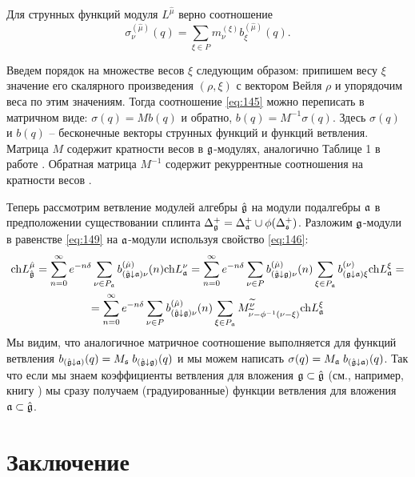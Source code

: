Для струнных функций модуля
$L^{\hat{\mu}}$ верно соотношение
\begin{equation}
  \label{eq:145}
   \sigma^{(\hat{\mu})}_{\nu}(q) = \sum_{\xi\in P} m^{(\xi)}_{\nu} b^{(\hat{\mu})}_{\xi}(q).
\end{equation}

Введем порядок на множестве весов $\xi$ следующим образом:
припишем весу  $\xi$ значение его скалярного произведения $(\rho,\xi)$ с вектором Вейля $\rho$ и упорядочим веса по этим значениям. Тогда соотношение \eqref{eq:145} можно переписать в матричном виде: $\sigma(q)=M b(q)$ и обратно,
$b(q)=M^{-1}\sigma(q)$. Здесь  $\sigma(q)$ и  $b(q)$ -- бесконечные векторы струнных функций и функций ветвления. Матрица $M$ содержит кратности весов в  $\mathfrak{g}$-модулях, аналогично Таблице 1 в работе \cite{2010arXiv1001}. Обратная матрица $M^{-1}$ содержит рекуррентные соотношения на кратности весов
\cite{il2010folded}.

Теперь рассмотрим ветвление модулей алгебры $\hat{\mathfrak{g}}$ на модули подалгебры $\mathfrak{a}$ в предположении существовании сплинта
$\Delta^{+}_{\mathfrak{g}}=\Delta^{+}_{\mathfrak{a}}\cup \phi(\Delta^{+}_{\mathfrak{s}})$.
Разложим  $\mathfrak{g}$-модули в равенстве \eqref{eq:149} на 
$\mathfrak{a}$-модули используя свойство \eqref{eq:146}:
\begin{multline}
  \label{eq:125}
  \mathrm{ch}L^{\hat{\mu}}_{\hat{\mathfrak{g}}}=
\sum_{n=0}^{\infty}e^{-n\delta} \sum_{\nu\in P_{\mathfrak{a}}} b^{(\hat{\mu})}_{(\hat{\mathfrak{g}}\downarrow\mathfrak{a})\nu}(n) \mathrm{ch} L^{\nu}_{\mathfrak{a}}=
\sum_{n=0}^{\infty} e^{-n\delta} \sum_{\nu\in P} b^{(\hat{\mu})}_{(\hat{\mathfrak{g}}\downarrow\mathfrak{g} )\nu}(n) \sum_{\xi\in P_{\mathfrak{a}}} b^{(\nu)}_{(\mathfrak{g}\downarrow \mathfrak{a}) \xi}\mathrm{ch} L^{\xi}_{\mathfrak{a}}=\\
=\sum_{n=0}^{\infty} e^{-n\delta} \sum_{\nu\in P} b^{(\hat{\mu})}_{(\hat{\mathfrak{g}}\downarrow\mathfrak{g} )\nu}(n) \sum_{\xi\in P_{\mathfrak{a}}} M^{\widetilde{\nu}}_{  \widetilde{\nu}-\phi^{-1}( \nu-\xi )}\mathrm{ch} L^{\xi}_{\mathfrak{a}}
\end{multline}
 Мы видим, что аналогичное матричное соотношение выполняется для функций ветвления $b_{(\hat{\mathfrak{g}}\downarrow\mathfrak{a})}(q)= M_{\mathfrak{s}}\;
b_{(\hat{\mathfrak{g}}\downarrow\mathfrak{g})}(q)$ и мы можем написать
$\sigma(q)=M_{\mathfrak{a}}\; b_{(\hat{\mathfrak{g}}\downarrow\mathfrak{a})}(q)$. Так что если мы знаем коэффициенты ветвления для вложения $\mathfrak{g}\subset\hat{\mathfrak{g}}$ (см., например, книгу \cite{kass1990ala}) мы сразу получаем (градуированные) функции ветвления для вложения $\mathfrak{a}\subset \hat{\mathfrak{g}}$.

\section{Заключение}

